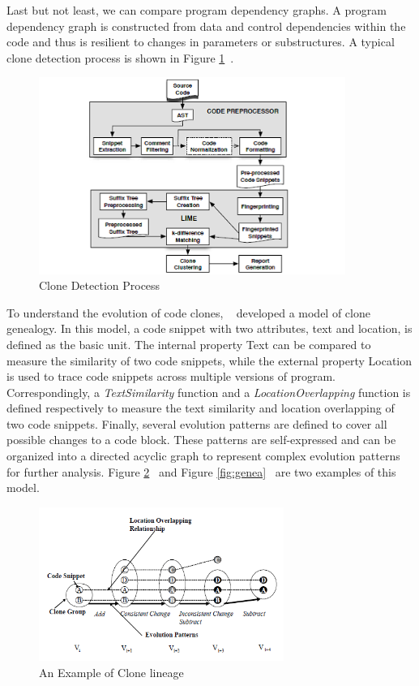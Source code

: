 \documentclass{acm_proc_article-sp}
\begin{document}
Last but not least, we can compare program dependency graphs. A program dependency graph is constructed from data and control dependencies within the code and thus is resilient to changes in parameters or substructures. A typical clone detection process is shown in Figure \ref{fig:detect}~\cite{towards_tool}.

\begin{figure}[h]
\centering
\includegraphics[width=10cm]{clone_detection}
\caption{Clone Detection Process}
\label{fig:detect}
\end{figure}

To understand the evolution of code clones, ~\cite{empirical} developed a model of clone genealogy. In this model, a code snippet with two attributes, text and location, is defined as the basic unit. The internal property Text can be compared to measure the similarity of two code snippets, while the external property Location is used to trace code snippets across multiple versions of program. Correspondingly, a \textit{TextSimilarity} function and a \textit{LocationOverlapping} function is defined respectively to measure the text similarity and location overlapping of two code snippets. Finally, several evolution patterns are defined to cover all possible changes to a code block. These patterns are self-expressed and can be organized into a directed acyclic graph to represent complex evolution patterns for further analysis. Figure \ref{fig:linea}~\cite{towards_tool} and Figure \ref{fig:genea}~\cite{towards_tool} are two examples of this model.

\begin{figure}[h]
\centering
\includegraphics[width=8cm]{lineage}
\caption{An Example of Clone lineage}
\label{fig:linea}
\end{figure}
\end{document}
